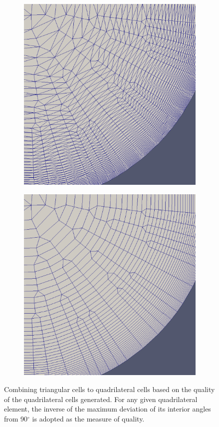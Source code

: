 \documentclass[conf]{new-aiaa}
\begin{document}
\begin{figure}
\centering
\begin{subfigure}{0.4\textwidth}
\includegraphics[width=0.9\linewidth]{combine-tris-to-quads/combineTrisToQuads1.eps}
\caption{}
\label{fig-triQuad1}
\end{subfigure}%
\begin{subfigure}{0.4\textwidth}
\includegraphics[width =0.9\linewidth]{combine-tris-to-quads/combineTrisToQuads2.eps}
\caption{}
\label{fig-triQuad2}
\end{subfigure}
\caption{Combining triangular cells to quadrilateral cells based on the quality of the quadrilateral cells generated. For any given quadrilateral element, the inverse of the maximum deviation of its interior angles from 90$^\circ$ is adopted as the measure of quality.}
\label{fig-triQuad}
\end{figure}
\end{document}
